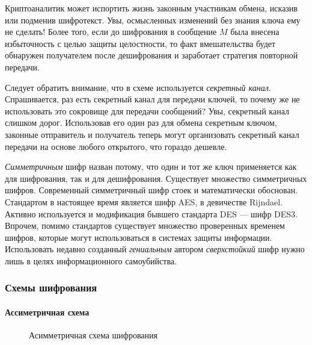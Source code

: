 Криптоаналитик может испортить жизнь законным участникам обмена, исказив или подменив шифротекст. Увы, осмысленных изменений без знания ключа ему не сделать! Более того, если до шифрования в сообщение $M$ была внесена избыточность с целью защиты целостности, то факт вмешательства будет обнаружен получателем после дешифрования и заработает стратегия повторной передачи.

Следует обратить внимание, что в схеме используется \emph{секретный канал}. Спрашивается, раз есть секретный канал для передачи ключей, то почему же не использовать это сокровище для передачи сообщений? Увы, секретный канал слишком дорог. Использовав его один раз для обмена секретным ключом, законные отправитель и получатель теперь могут организовать секретный канал передачи на основе любого открытого, что гораздо дешевле.

\emph{Симметричным} шифр назван потому, что один и тот же ключ применяется как для шифрования, так и для дешифрования.
Существует множество симметричных шифров. Современный симметричный шифр стоек и математически обоснован. Стандартом в настоящее время является шифр AES, в девичестве Rijndael. Активно используется и модификация бывшего стандарта DES --- шифр DES3. Впрочем, помимо стандартов существует множество проверенных временем шифров, которые могут использоваться в системах защиты информации. Использовать недавно созданный \emph{гениальным} автором \emph{сверхстойкий} шифр нужно лишь в целях информационного самоубийства.


\begin{frame}
\frametitle{Схемы шифрования}
\framesubtitle{Ассиметричная схема}
\begin{figure}
    \begin{center}
    \end{center}
    \caption{Асимметричная схема шифрования}\label{pict:asymmcipher}
\end{figure} 
\end{frame}


